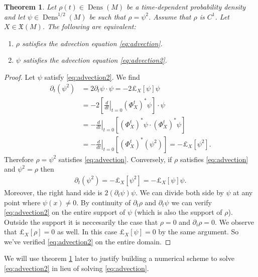 \documentclass[letterpaper, 10 pt, conference]{ieeeconf}
\newtheorem{thm}{Theorem}[section]
\DeclareMathOperator{\Dens}{Dens}
\begin{document}
  \begin{thm} \label{thm:advection}
    Let $\rho(t) \in \Dens(M)$ be a time-dependent probability density
    and let $\psi \in \Dens^{1/2}(M)$ be such that $\rho = \psi^2$.
    Assume that $\rho$ is $C^1$.
    Let $X \in \mathfrak{X}(M)$.
    The following are equivalent:
    \begin{enumerate}
      \item $\rho$ satisfies the advection equation \eqref{eq:advection}.
      \item $\psi$ satisfies the advection equation \eqref{eq:advection2}.
    \end{enumerate}
  \end{thm}
  \begin{proof}
    Let $\psi$ satisfy \eqref{eq:advection2}.
    We find
    \begin{align*}
      \partial_t (\psi^2) &= 2 \partial_t\psi \cdot \psi
      =-2 \pounds_X[\psi] \psi \\
      &= - 2 \left[ \left.\frac{d}{dt}\right|_{t=0}
         (\Phi_X^t)^* \psi \right] \cdot \psi \\
      &= - \left. \frac{d}{dt} \right|_{t=0}
        \left[ (\Phi_X^t)^* \psi \cdot (\Phi_X^t)^* \psi \right]\\
      &= - \left. \frac{d}{dt} \right|_{t=0}
        \left[ (\Phi_X^t)^* (\psi^2) \right] 
      = - \pounds_X[\psi^2].
    \end{align*}
    Therefore $\rho = \psi^2$ satisfies \eqref{eq:advection}.
    Conversely, if $\rho$ satisfies \eqref{eq:advection}
    and $\psi^2 = \rho$ then
    \begin{align*}
      \partial_t (\psi^2) = - \pounds_X[\psi^2] = - \pounds_X[\psi] \psi.
    \end{align*}
    Moreover, the right hand side is $2 (\partial_t \psi) \psi$.
    We can divide both side by $\psi$ at any point where $\psi(x) \neq 0$.
    By continuity of $\partial_t \rho$ and $\partial_t \psi$ we can
    verify \eqref{eq:advection2} on the entire support of $\psi$
    (which is also the support of $\rho$).
    Outside the support it is neccesarily the case that
    $\rho = 0$ and  $\partial_i \rho = 0$.
    We observe that $\pounds_X[\rho] = 0$ as well.
    In this case $\pounds_X[\psi] = 0$ by the same argument.
    So we've verified \eqref{eq:advection2} on the entire domain.
  \end{proof}

  We will use theorem \ref{thm:advection} later to justify building
  a numerical scheme to solve \eqref{eq:advection2} in lieu of solving 
  \eqref{eq:advection}.
\end{document}

